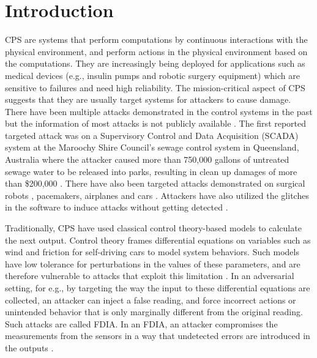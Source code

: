 
\chapter{Introduction }
\label{ch:Chapter1}
\ac{CPS} are systems that perform computations by continuous interactions with the physical environment, and perform actions in the physical environment based on the computations.   
They are increasingly being deployed for applications \cite{10.1145/2038642.2038685}\cite{10.1145/1837274.1837463} \cite{6051465} such as medical devices (e.g., insulin pumps and robotic surgery equipment) which are sensitive to failures and need high reliability. 
The mission-critical aspect of \ac{CPS} suggests that they are usually target systems for attackers to cause damage. 
There have been multiple attacks demonstrated in the control systems in the past but the information of most attacks is not publicly available \cite{doi:10.1080/13518040590969785}.
The first reported targeted attack was on a Supervisory Control and Data Acquisition (SCADA) system \cite{article22} at the Maroochy Shire Council’s sewage control system in Queensland, Australia where the attacker caused more than 750,000 gallons of untreated sewage water to be released into parks, resulting in clean up damages of more than \$200,000 \cite{10.1016/j.adhoc.2009.04.012}.
There have also been targeted attacks demonstrated on surgical robots \cite{7579758}, pacemakers\cite{4531149}, airplanes \cite{217595} and  cars \cite{10.5555/1929820.1929848}.
Attackers have also utilized the glitches in the software to induce attacks without getting detected \cite{242054}. 


Traditionally, \ac{CPS} have used classical control theory-based models  \cite{1337806} \cite{10.1145/2038642.2038667} \cite{6051465} to calculate the next output. 
Control theory frames differential equations on variables such as wind and friction for self-driving cars to model system behaviors. 
Such models have low tolerance for perturbations in the values of these parameters, and are therefore vulnerable to attacks that exploit this limitation \cite{10.1145/1952982.1952995}. 
In an adversarial setting, for e.g., by targeting the way the input to these differential equations are collected, an attacker can inject a false reading, and force incorrect actions or unintended behavior that is only marginally different from the original reading. 
Such attacks are called \ac{FDIA}. In an \ac{FDIA}, an attacker compromises the measurements from the sensors in a way that undetected errors are introduced in the outputs \cite{7438916}. 



